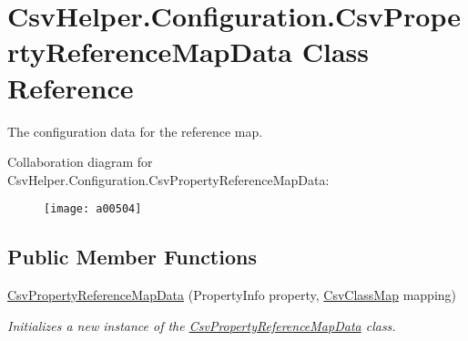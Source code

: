 \hypertarget{a00076}{\section{Csv\-Helper.\-Configuration.\-Csv\-Property\-Reference\-Map\-Data Class Reference}
\label{a00076}
}


The configuration data for the reference map.  




Collaboration diagram for Csv\-Helper.\-Configuration.\-Csv\-Property\-Reference\-Map\-Data\-:
\nopagebreak
\begin{figure}[H]
\begin{center}
\leavevmode
\texttt{[image: a00504]}
\end{center}
\end{figure}
\subsection*{Public Member Functions}
\begin{DoxyCompactItemize}
\item 
\hyperlink{a00076_ad6fe2913932a9fe434f8a908dec30e8b}{Csv\-Property\-Reference\-Map\-Data} (Property\-Info property, \hyperlink{a00060}{Csv\-Class\-Map} mapping)
\begin{DoxyCompactList}\small\item\em Initializes a new instance of the \hyperlink{a00076}{Csv\-Property\-Reference\-Map\-Data} class. \end{DoxyCompactList}\end{DoxyCompactItemize}
